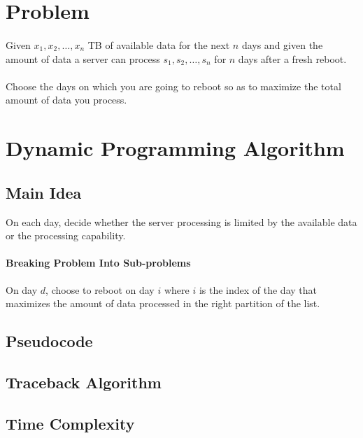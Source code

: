 \documentclass[12pt]{article}
\begin{document}
\section{Problem}
\paragraph{}
Given $x_1, x_2, \dots, x_n$ TB of available data for the next $n$ days and given the amount of data a server can process $s_1, s_2, \dots, s_n$ for $n$ days after a fresh reboot.
\paragraph{}
Choose the days on which you are going to reboot so as to maximize the total amount of data you process.
\section{Dynamic Programming Algorithm}
\subsection{Main Idea}
On each day, decide whether the server processing is limited by the available data or the processing capability.
\paragraph{Breaking Problem Into Sub-problems}
On day $d$, choose to reboot on day $i$ where $i$ is the index of the day that maximizes the amount of data processed in the right partition of the list.
\subsection{Pseudocode}
\subsection{Traceback Algorithm}
\subsection{Time Complexity}
\end{document}
